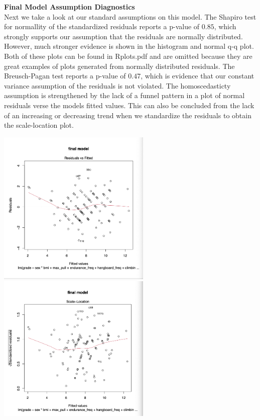 \documentclass[11pt]{amsart}
\begin{document}
\newpage
{\bf\large Final Model Assumption Diagnostics}\\
Next we take a look at our standard assumptions on this model.
The Shapiro test for normallity of the standardized residuals reports a p-value of $0.85$, which strongly supports our assumption that the residuals are normally distributed.
However, much stronger evidence is shown in the histogram and normal q-q plot.
Both of these plots can be found in Rplots.pdf and are omitted because they are great examples of plots generated from normally distributed residuals. 
The Breusch-Pagan test reports a p-value of $0.47$, which is evidence that our constant variance assumption of the residuals is not violated. 
The homoscedasticty assumption is strengthened by the lack of a funnel pattern in a plot of normal residuals verse the models fitted values.
This can also be concluded from the lack of an increasing or decreasing trend when we standardize the residuals to obtain the scale-location plot.\\
\begin{center}
\includegraphics[width=0.55\textwidth]{resid1}\\
\includegraphics[width=0.55\textwidth]{scale}
\end{center}
\end{document}
